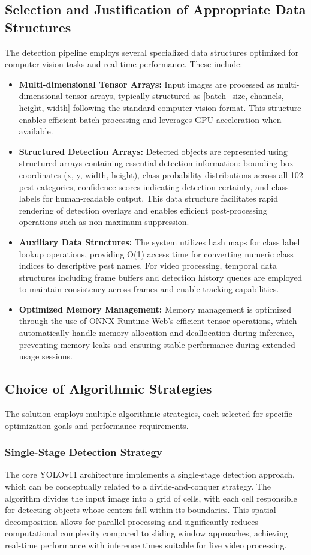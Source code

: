 \subsection{Selection and Justification of Appropriate Data Structures}
The detection pipeline employs several specialized data structures optimized for computer vision tasks and real-time performance. These include:
\begin{itemize}
    \item \textbf{Multi-dimensional Tensor Arrays:} Input images are processed as multi-dimensional tensor arrays, typically structured as [batch\_size, channels, height, width] following the standard computer vision format. This structure enables efficient batch processing and leverages GPU acceleration when available.
    \item \textbf{Structured Detection Arrays:} Detected objects are represented using structured arrays containing essential detection information: bounding box coordinates (x, y, width, height), class probability distributions across all 102 pest categories, confidence scores indicating detection certainty, and class labels for human-readable output. This data structure facilitates rapid rendering of detection overlays and enables efficient post-processing operations such as non-maximum suppression.
    \item \textbf{Auxiliary Data Structures:} The system utilizes hash maps for class label lookup operations, providing O(1) access time for converting numeric class indices to descriptive pest names. For video processing, temporal data structures including frame buffers and detection history queues are employed to maintain consistency across frames and enable tracking capabilities.
    \item \textbf{Optimized Memory Management:} Memory management is optimized through the use of ONNX Runtime Web's efficient tensor operations, which automatically handle memory allocation and deallocation during inference, preventing memory leaks and ensuring stable performance during extended usage sessions.
\end{itemize}

\subsection{Choice of Algorithmic Strategies}
The solution employs multiple algorithmic strategies, each selected for specific optimization goals and performance requirements.

\subsubsection{Single-Stage Detection Strategy}
The core YOLOv11 architecture implements a single-stage detection approach, which can be conceptually related to a divide-and-conquer strategy. The algorithm divides the input image into a grid of cells, with each cell responsible for detecting objects whose centers fall within its boundaries. This spatial decomposition allows for parallel processing and significantly reduces computational complexity compared to sliding window approaches, achieving real-time performance with inference times suitable for live video processing.

